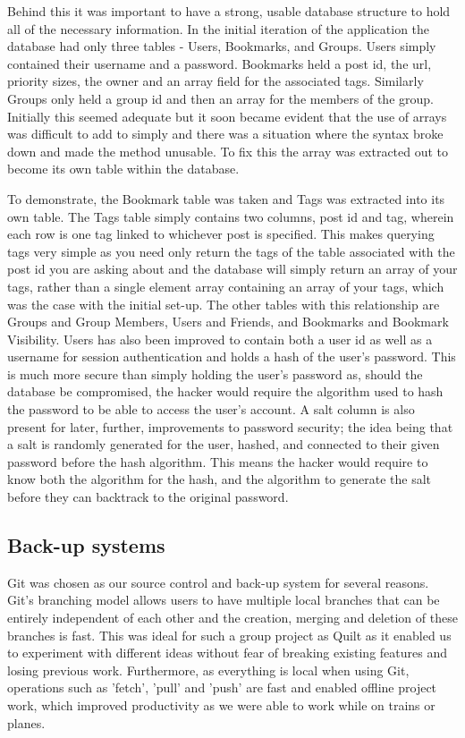 \documentclass[a4wide, 10pt]{article}
\begin{document}
Behind this it was important to have a strong, usable database structure to hold all of the necessary information. In the initial iteration of the application the database had only three tables - Users, Bookmarks, and Groups. Users simply contained their username and a password. Bookmarks held a post id, the url, priority sizes, the owner and an array field for the associated tags. Similarly Groups only held a group id and then an array for the members of the group. Initially this seemed adequate but it soon became evident that the use of arrays was difficult to add to simply and there was a situation where the syntax broke down and made the method unusable. To fix this the array was extracted out to become its own table within the database. 

To demonstrate, the Bookmark table was taken and Tags was extracted into its own table. The Tags table simply contains two columns, post id and tag, wherein each row is one tag linked to whichever post is specified. This makes querying tags very simple as you need only return the tags of the table associated with the post id you are asking about and the database will simply return an array of your tags, rather than a single element array containing an array of your tags, which was the case with the initial set-up. The other tables with this relationship are Groups and Group Members, Users and Friends, and Bookmarks and Bookmark Visibility. Users has also been improved to contain both a user id as well as a username for session authentication and holds a hash of the user's password. This is much more secure than simply holding the user's password as, should the database be compromised, the hacker would require the algorithm used to hash the password to be able to access the user's account. A salt column is also present for later, further, improvements to password security; the idea being that a salt is randomly generated for the user, hashed, and connected to their given password before the hash algorithm. This means the hacker would require to know both the algorithm for the hash, and the algorithm to generate the salt before they can backtrack to the original password.

\subsection{Back-up systems}

Git was chosen as our source control and back-up system for several reasons. Git's branching model allows users to have multiple local branches that can be entirely independent of each other and the creation, merging and deletion of these branches is fast. This was ideal for such a group project as Quilt as it enabled us to experiment with different ideas without fear of breaking existing features and losing  previous work. Furthermore, as everything is local when using Git, operations such as 'fetch', 'pull' and 'push' are fast and enabled offline project work, which improved productivity as we were able to work while on trains or planes.  
\end{document}
